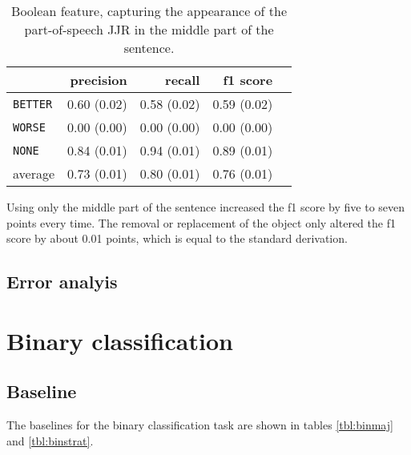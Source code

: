 \begin{table}[h] 
 \centering 
 \caption{Boolean feature, capturing the appearance of the part-of-speech JJR in the middle part of the sentence.} 
 \label{tbl:3jjr}
\begin{tabular}{@{}lrrrr@{}}
\toprule
 	&	 precision &	 recall &	 f1 score  \\ \midrule 
\texttt{BETTER}	&	 0.60 \scriptsize{(0.02)} &	 0.58 \scriptsize{(0.02)} &	 0.59 \scriptsize{(0.02)}  \\ 
\texttt{WORSE}	&	 0.00 \scriptsize{(0.00)} &	 0.00 \scriptsize{(0.00)} &	 0.00 \scriptsize{(0.00)}  \\ 
\texttt{NONE}	&	 0.84 \scriptsize{(0.01)} &	 0.94 \scriptsize{(0.01)} &	 0.89 \scriptsize{(0.01)}  \\ 
average	&	 0.73 \scriptsize{(0.01)} &	 0.80 \scriptsize{(0.01)} &	 0.76 \scriptsize{(0.01)}  \\ 
\bottomrule
\end{tabular}
\end{table}


Using only the middle part of the sentence increased the f1 score by five to seven points every time. The removal or replacement of the object only altered the f1 score by about 0.01 points, which is equal to the standard derivation.



\subsection{Error analyis}


\section{Binary classification}
\subsection{Baseline}
The baselines for the binary classification task are shown in tables \ref{tbl:binmaj} and \ref{tbl:binstrat}.


